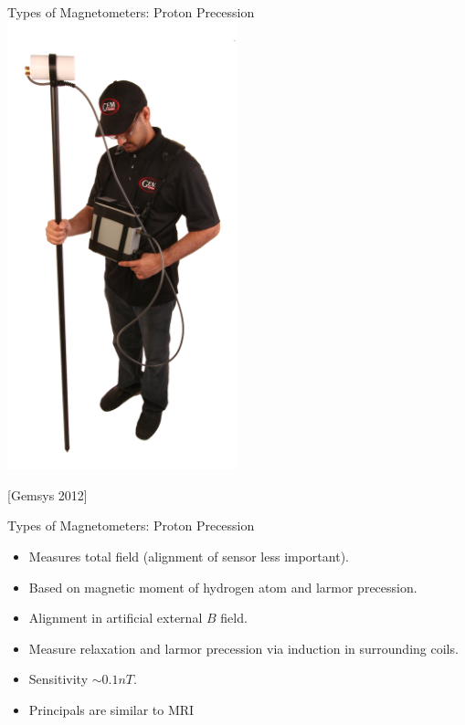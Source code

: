 \begin{frame}
  \begin{PointSix}{Types of Magnetometers: Proton Precession}
    \includegraphics[width=0.5\textwidth]{Figures/Magnetics/ProtonPrecession_Gemsys2012.png}

    \tiny [Gemsys 2012]
  \end{PointSix}
\end{frame}

\begin{frame}
  \begin{PointSix}{Types of Magnetometers: Proton Precession}
  \small
    \begin{itemize}
      \item Measures total field (alignment of sensor less important).
      \item Based on magnetic moment of hydrogen atom and larmor precession.
      \item Alignment in artificial external $B$ field.
      \item Measure relaxation and larmor precession via induction in surrounding coils.
      \item Sensitivity $\sim 0.1 nT$.
      \item Principals are similar to MRI
    \end{itemize}
  \end{PointSix}
\end{frame}



